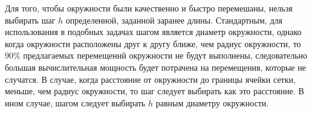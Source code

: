 Для того, чтобы окружности были качественно и быстро перемешаны, нельзя выбирать шаг $h$ определенной, заданной заранее длины. Стандартным, для использования в подобных задачах шагом является диаметр окружности, однако когда окружности расположены друг к другу ближе, чем радиус окружности, то $90\%$ предлагаемых перемещений окружности не будут выполнены, следовательно большая вычислительная мощность будет потрачена на перемещения, которые не случатся.
В случае, когда расстояние от окружности до границы ячейки сетки, меньше, чем радиус окружности, то шаг следует выбирать как это расстояние. В ином случае, шагом следует выбирать $h$ равным диаметру окружности. 